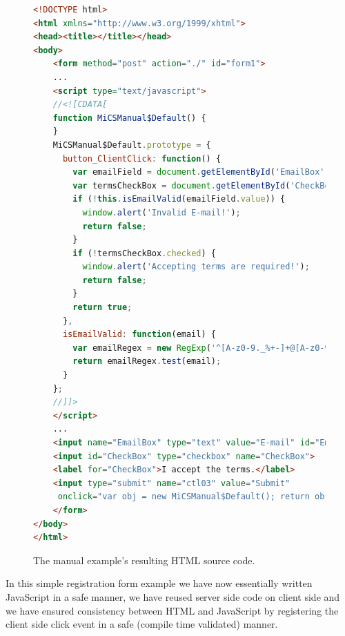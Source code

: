 \begin{figure}[H]
\begin{lstlisting}[language=html,style=HTMLJSStyle]
<!DOCTYPE html>
<html xmlns="http://www.w3.org/1999/xhtml">
<head><title></title></head>
<body>
    <form method="post" action="./" id="form1">
    ...
    <script type="text/javascript">
    //<![CDATA[
    function MiCSManual$Default() {
    }
    MiCSManual$Default.prototype = {
      button_ClientClick: function() {
        var emailField = document.getElementById('EmailBox');
        var termsCheckBox = document.getElementById('CheckBox');
        if (!this.isEmailValid(emailField.value)) {
          window.alert('Invalid E-mail!');
          return false;
        }
        if (!termsCheckBox.checked) {
          window.alert('Accepting terms are required!');
          return false;
        }
        return true;
      },
      isEmailValid: function(email) {
        var emailRegex = new RegExp('^[A-z0-9._%+-]+@[A-z0-9.-]+.[A-z]{2,4}$');
        return emailRegex.test(email);
      }
    };
    //]]>
    </script>
    ...
    <input name="EmailBox" type="text" value="E-mail" id="EmailBox">
    <input id="CheckBox" type="checkbox" name="CheckBox">
    <label for="CheckBox">I accept the terms.</label>
    <input type="submit" name="ctl03" value="Submit" 
     onclick="var obj = new MiCSManual$Default(); return obj.button_ClientClick();">
    </form>
</body>
</html>
\end{lstlisting}
\caption{The manual example's resulting HTML source code.}
\label{fig:manualHtmlSource}
\end{figure}

In this simple registration form example we have now essentially written JavaScript in a safe manner, we have reused server side code on client side and we have ensured consistency between HTML and JavaScript by registering the client side click event in a safe (compile time validated) manner.


